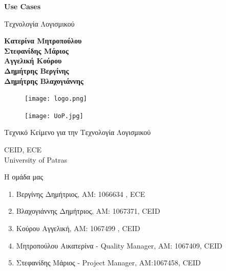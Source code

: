 \documentclass{article}
\begin{document}

\begin{titlepage}
   \begin{center}
       \vspace*{1cm}

       \textbf{\huge Use Cases}

       \vspace{0.5cm}
        Τεχνολογία Λογισμικού
            
       \vspace{1cm}

       \textbf{Κατερίνα Μητροπούλου\\Στεφανίδης Μάριος\\Αγγελική Κούρου\\Δημήτρης Βεργίνης\\Δημήτρης Βλαχογιάννης}
       
       \begin{figure}[!htb]
        \centering
        \texttt{[image: logo.png]}
        \end{figure}
        
        \vspace{0.5cm}
        
        \begin{figure}[!htb]
        \centering
        \texttt{[image: UoP.jpg]}
        \end{figure}


       \vfill
            
       Τεχνικό Κείμενο για την Τεχνολογία Λογισμικού\\
            
       \vspace{0.5cm}
            
       CEID, ECE\\
       University of Patras\\
            
   \end{center}
\end{titlepage}


 \noindent Η ομάδα μας

\begin{enumerate}
  \item Βεργίνης Δημήτριος, ΑΜ: 1066634 , ECE
  \item Βλαχογιάννης Δημήτριος, ΑΜ: 1067371, CEID
  \item Κούρου Αγγελική, ΑΜ: 1067499 , CEID
  \item Μητροπούλου Αικατερίνα - Quality Manager, ΑΜ: 1067409, CEID
  \item Στεφανίδης Μάριος - Project Manager, ΑΜ:1067458, CEID
\end{enumerate}
\end{document}
